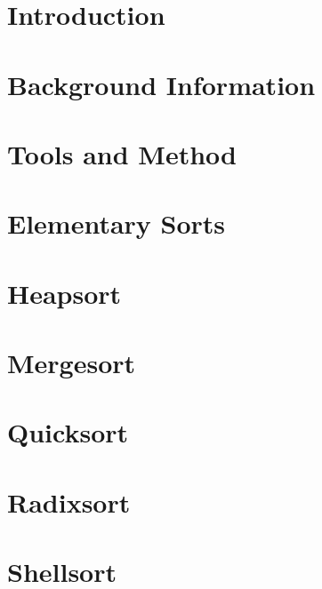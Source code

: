 \documentclass{report}
\begin{document}
\tableofcontents
\listoffigures

\setlength{\parskip}{1em}
\setlength{\parindent}{0ex}

\chapter{Introduction}



\chapter{Background Information}



\chapter{Tools and Method}



\chapter{Elementary Sorts}



\chapter{Heapsort}



\chapter{Mergesort}



\chapter{Quicksort}



\chapter{Radixsort}



\chapter{Shellsort}
\end{document}
